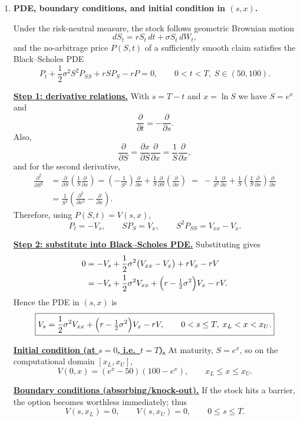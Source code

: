 \documentclass{article}
\begin{document}
\begin{enumerate}
\item[(a)] \textbf{PDE, boundary conditions, and initial condition in $(s,x)$.}

Under the risk-neutral measure, the stock follows geometric Brownian motion
\[
dS_t=rS_t\,dt+\sigma S_t\,dW_t,
\]
and the no-arbitrage price $P(S,t)$ of a sufficiently smooth claim satisfies the Black--Scholes PDE
\[
P_t+\frac12\sigma^2S^2P_{SS}+rSP_S-rP=0,
\qquad 0<t<T,\; S\in(50,100).
\]

\medskip
\noindent\underline{\textbf{Step 1: derivative relations.}}
With $s=T-t$ and $x=\ln S$ we have $S=e^x$ and
\[
\frac{\partial}{\partial t}=-\frac{\partial}{\partial s}.
\]
Also,
\[
\frac{\partial}{\partial S}=\frac{\partial x}{\partial S}\frac{\partial}{\partial x}
=\frac{1}{S}\frac{\partial}{\partial x},
\]
and for the second derivative,
\begin{align*}
\frac{\partial^2}{\partial S^2}
&=\frac{\partial}{\partial S}\left(\frac{1}{S}\frac{\partial}{\partial x}\right)
=\left(-\frac{1}{S^2}\right)\frac{\partial}{\partial x}
+\frac{1}{S}\frac{\partial}{\partial S}\left(\frac{\partial}{\partial x}\right)
\;=\;-\frac{1}{S^2}\frac{\partial}{\partial x}
+\frac{1}{S}\left(\frac{1}{S}\frac{\partial}{\partial x}\right)\frac{\partial}{\partial x} \\
&=\frac{1}{S^2}\left(\frac{\partial^2}{\partial x^2}-\frac{\partial}{\partial x}\right).
\end{align*}
Therefore, using $P(S,t)=V(s,x)$,
\[
P_t=-V_s,\qquad SP_S=V_x,\qquad S^2P_{SS}=V_{xx}-V_x.
\]

\medskip
\noindent\underline{\textbf{Step 2: substitute into Black--Scholes PDE.}}
Substituting gives
\begin{align*}
0
&= -V_s+\frac12\sigma^2\bigl(V_{xx}-V_x\bigr)+rV_x-rV \\
&= -V_s+\frac12\sigma^2V_{xx}+\Bigl(r-\tfrac12\sigma^2\Bigr)V_x-rV.
\end{align*}
Hence the PDE in $(s,x)$ is
\[
\boxed{
V_s=\frac12\sigma^2V_{xx}+\Bigl(r-\tfrac12\sigma^2\Bigr)V_x-rV,
\qquad 0<s\le T,\; x_L<x<x_U.
}
\]

\medskip
\noindent\underline{\textbf{Initial condition (at $s=0$, i.e.\ $t=T$).}}
At maturity, $S=e^x$, so on the computational domain $[x_L,x_U]$,
\[
\boxed{
V(0,x)=(e^x-50)(100-e^x),\qquad x_L\le x\le x_U.
}
\]

\medskip
\noindent\underline{\textbf{Boundary conditions (absorbing/knock-out).}}
If the stock hits a barrier, the option becomes worthless immediately; thus
\[
\boxed{
V(s,x_L)=0,\qquad V(s,x_U)=0,\qquad 0\le s\le T.
}
\]


\end{enumerate}
\end{document}
